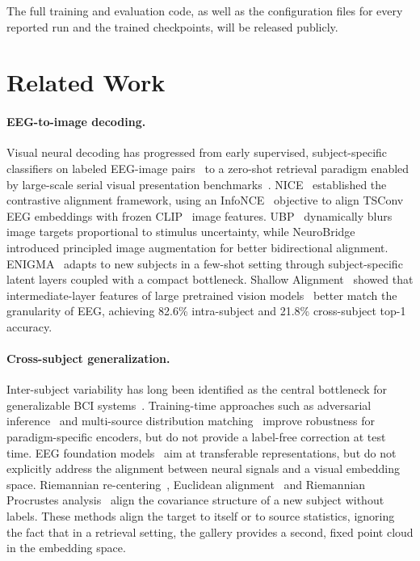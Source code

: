 \documentclass[10pt,twocolumn,letterpaper]{article}
\begin{document}
The full training and evaluation code, as well as the configuration files for every reported run and the trained checkpoints, will be released publicly.



\section{Related Work}
\label{sec:related}

\paragraph{EEG-to-image decoding.}
Visual neural decoding has progressed from early supervised, subject-specific classifiers on labeled EEG-image pairs~\cite{spampinato2017deep,du2023bravl} to a zero-shot retrieval paradigm enabled by large-scale serial visual presentation benchmarks~\cite{gifford2022things,grootswagers2022things}.
NICE~\cite{song2024nice} established the contrastive alignment framework, using an InfoNCE~\cite{oord2019cpc} objective to align TSConv EEG embeddings with frozen CLIP~\cite{radford2021clip} image features.
UBP~\cite{wu2025ubp} dynamically blurs image targets proportional to stimulus uncertainty, while NeuroBridge~\cite{zhang2025neurobridge} introduced principled image augmentation for better bidirectional alignment.
ENIGMA~\cite{kneeland2025enigma} adapts to new subjects in a few-shot setting through subject-specific latent layers coupled with a compact bottleneck.
Shallow Alignment~\cite{du2025shallow} showed that intermediate-layer features of large pretrained vision models~\cite{chen2024internvl} better match the granularity of EEG, achieving 82.6\% intra-subject and 21.8\% cross-subject top-1 accuracy.

\paragraph{Cross-subject generalization.}
Inter-subject variability has long been identified as the central bottleneck for generalizable BCI systems~\cite{jayaram2016transfer,lotte2018review,samek2013transferring}. Training-time approaches such as adversarial inference~\cite{ozdenizci2020adversarial} and multi-source distribution matching~\cite{chen2021msmda,she2023multisource} improve robustness for paradigm-specific encoders, but do not provide a label-free correction at test time. EEG foundation models~\cite{elouahidi2025reve,cui2023neurogpt} aim at transferable representations, but do not explicitly address the alignment between neural signals and a visual embedding space. Riemannian re-centering~\cite{zanini2018transfer}, Euclidean alignment~\cite{he2020euclidean} and Riemannian Procrustes analysis~\cite{rodrigues2019rpa} align the covariance structure of a new subject without labels. These methods align the target to itself or to source statistics, ignoring the fact that in  a retrieval setting, the gallery provides a second, fixed point cloud in the embedding space. 
\end{document}
